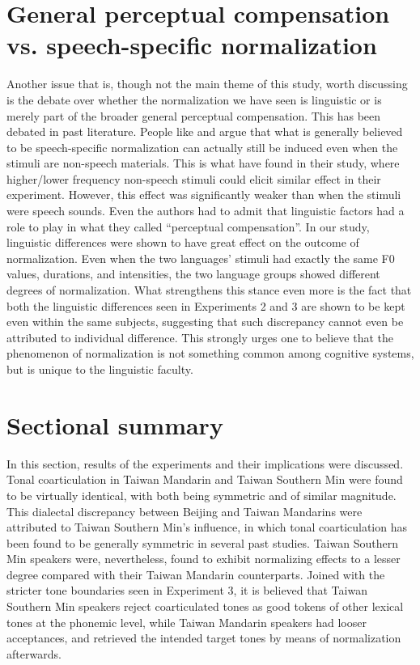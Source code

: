 \section{General perceptual compensation vs. speech-specific normalization}\label{section:General perceptual compensation vs. speech-specific normalization}

Another issue that is, though not the main theme of this study, worth discussing is the debate over whether the normalization we have seen is linguistic or is merely part of the broader general perceptual compensation. This has been debated in past literature. People like \cite{WatkinsMakin1994} and \cite{Zhangetal2022} argue that what is generally believed to be speech-specific normalization can actually still be induced even when the stimuli are non-speech materials. This is what \citeauthor{Zhangetal2022} have found in their study, where higher/lower frequency non-speech stimuli could elicit similar effect in their experiment. However, this effect was significantly weaker than when the stimuli were speech sounds. Even the authors had to admit that linguistic factors had a role to play in what they called ``perceptual compensation''. In our study, linguistic differences were shown to have great effect on the outcome of normalization. Even when the two languages' stimuli had exactly the same F0 values, durations, and intensities, the two language groups showed different degrees of normalization. What strengthens this stance even more is the fact that both the linguistic differences seen in Experiments 2 and 3 are shown to be kept even within the same subjects, suggesting that such discrepancy cannot even be attributed to individual difference. This strongly urges one to believe that the phenomenon of normalization is not something common among cognitive systems, but is unique to the linguistic faculty.

\section{Sectional summary}
In this section, results of the experiments and their implications were discussed. Tonal coarticulation in Taiwan Mandarin and Taiwan Southern Min were found to be virtually identical, with both being symmetric and of similar magnitude. This dialectal discrepancy between Beijing and Taiwan Mandarins were attributed to Taiwan Southern Min's influence, in which tonal coarticulation has been found to be generally symmetric in several past studies. Taiwan Southern Min speakers were, nevertheless, found to exhibit normalizing effects to a lesser degree compared with their Taiwan Mandarin counterparts. Joined with the stricter tone boundaries seen in Experiment 3, it is believed that Taiwan Southern Min speakers reject coarticulated tones as good tokens of other lexical tones at the phonemic level, while Taiwan Mandarin speakers had looser acceptances, and retrieved the intended target tones by means of normalization afterwards.

